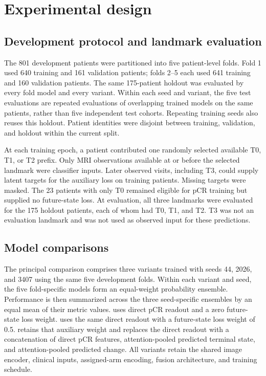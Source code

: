 \section{Experimental design}
\label{sec:experiments}
\subsection{Development protocol and landmark evaluation}
The 801 development patients were partitioned into five patient-level folds. Fold 1 used 640 training and 161 validation patients; folds 2--5 each used 641 training and 160 validation patients. The same 175-patient holdout was evaluated by every fold model and every variant. Within each seed and variant, the five test evaluations are repeated evaluations of overlapping trained models on the same patients, rather than five independent test cohorts. Repeating training seeds also reuses this holdout. Patient identities were disjoint between training, validation, and holdout within the current split.

At each training epoch, a patient contributed one randomly selected available T0, T1, or T2 prefix. Only MRI observations available at or before the selected landmark were classifier inputs. Later observed visits, including T3, could supply latent targets for the auxiliary loss on training patients. Missing targets were masked. The 23 patients with only T0 remained eligible for pCR training but supplied no future-state loss. At evaluation, all three landmarks were evaluated for the 175 holdout patients, each of whom had T0, T1, and T2. T3 was not an evaluation landmark and was not used as observed input for these predictions.

\subsection{Model comparisons}
The principal comparison comprises three variants trained with seeds 44, 2026, and 3407 using the same five development folds. Within each variant and seed, the five fold-specific models form an equal-weight probability ensemble. Performance is then summarized across the three seed-specific ensembles by an equal mean of their metric values. \nojepa{} uses direct pCR readout and a zero future-state loss weight. \direct{} uses the same direct readout with a future-state loss weight of 0.5. \fullmodel{} retains that auxiliary weight and replaces the direct readout with a concatenation of direct pCR features, attention-pooled predicted terminal state, and attention-pooled predicted change. All variants retain the shared image encoder, clinical inputs, assigned-arm encoding, fusion architecture, and training schedule.

